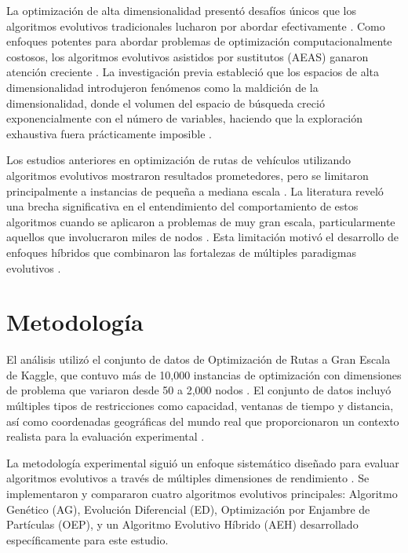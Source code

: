 \documentclass[12pt,a4paper]{article}
\begin{document}
La optimización de alta dimensionalidad presentó desafíos únicos que los algoritmos evolutivos tradicionales lucharon por abordar efectivamente \cite{bellman1961adaptive}. Como enfoques potentes para abordar problemas de optimización computacionalmente costosos, los algoritmos evolutivos asistidos por sustitutos (AEAS) ganaron atención creciente \cite{cordeau2007vrp}. La investigación previa estableció que los espacios de alta dimensionalidad introdujeron fenómenos como la maldición de la dimensionalidad, donde el volumen del espacio de búsqueda creció exponencialmente con el número de variables, haciendo que la exploración exhaustiva fuera prácticamente imposible \cite{keogh2001curse}.

Los estudios anteriores en optimización de rutas de vehículos utilizando algoritmos evolutivos mostraron resultados prometedores, pero se limitaron principalmente a instancias de pequeña a mediana escala \cite{potvin1996genetic}. La literatura reveló una brecha significativa en el entendimiento del comportamiento de estos algoritmos cuando se aplicaron a problemas de muy gran escala, particularmente aquellos que involucraron miles de nodos \cite{cordeau2007vrp}. Esta limitación motivó el desarrollo de enfoques híbridos que combinaron las fortalezas de múltiples paradigmas evolutivos \cite{ombuki2006multi}.

\section{Metodología}

El análisis utilizó el conjunto de datos de Optimización de Rutas a Gran Escala de Kaggle, que contuvo más de 10,000 instancias de optimización con dimensiones de problema que variaron desde 50 a 2,000 nodos \cite{christofides1979combinatorial}. El conjunto de datos incluyó múltiples tipos de restricciones como capacidad, ventanas de tiempo y distancia, así como coordenadas geográficas del mundo real que proporcionaron un contexto realista para la evaluación experimental \cite{solomon1987algorithms}.

La metodología experimental siguió un enfoque sistemático diseñado para evaluar algoritmos evolutivos a través de múltiples dimensiones de rendimiento \cite{barr1995designing}. Se implementaron y compararon cuatro algoritmos evolutivos principales: Algoritmo Genético (AG), Evolución Diferencial (ED), Optimización por Enjambre de Partículas (OEP), y un Algoritmo Evolutivo Híbrido (AEH) desarrollado específicamente para este estudio.
\end{document}
